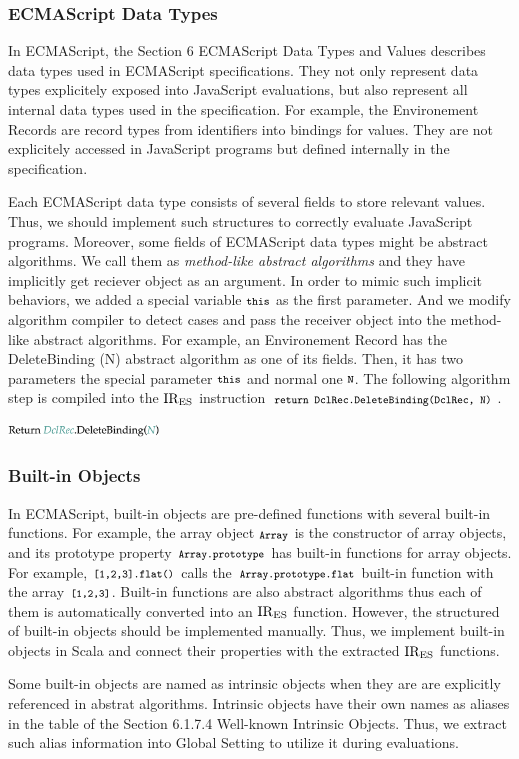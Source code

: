 \subsubsection{ECMAScript Data Types}

In ECMAScript, the Section \textsf{6 ECMAScript Data Types and Values} describes
data types used in ECMAScript specifications. They not only represent
data types explicitely exposed into JavaScript evaluations, but also
represent all internal data types used in the specification.
For example, the Environement Records are record types from identifiers
into bindings for values. They are not explicitely accessed in JavaScript
programs but defined internally in the specification.

Each ECMAScript data type consists of several fields to store relevant values.
Thus, we should implement such structures to correctly evaluate JavaScript
programs. Moreover, some fields of ECMAScript data types might be
abstract algorithms. We call them as \textit{method-like abstract algorithms}
and they have implicitly get reciever object as an argument.
In order to mimic such implicit behaviors, we added a special variable
\( \texttt{\footnotesize this} \) as the first parameter. And we modify algorithm compiler
to detect cases and pass the receiver object into the method-like abstract
algorithms. For example, an Environement Record has the \textsf{DeleteBinding (N)}
abstract algorithm as one of its fields. Then, it has two parameters the special
parameter \( \texttt{\footnotesize this} \) and normal one \( \texttt{\footnotesize N} \).
The following algorithm step is compiled into the \( \text{IR}_\text{ES} \) instruction
\( \texttt{\footnotesize return DclRec.DeleteBinding(DclRec, N)} \).
\begin{center}
  \includegraphics[width=0.3\textwidth]{img/method-like-example.png}
\end{center}


\subsubsection{Built-in Objects}
In ECMAScript, built-in objects are pre-defined functions with several
built-in functions. For example, the array object \( \texttt{\footnotesize Array} \)
is the constructor of array objects, and its prototype property
\( \texttt{\footnotesize Array.prototype} \) has built-in functions for array objects.
For example, \( \texttt{\footnotesize[1,2,3].flat()} \) calls the
\( \texttt{\footnotesize Array.prototype.flat} \) built-in function with the array
\( \texttt{\footnotesize[1,2,3]} \). Built-in functions are also abstract algorithms
thus each of them is automatically converted into an \( \text{IR}_\text{ES} \) function.
However, the structured of built-in objects should be implemented manually.
Thus, we implement built-in objects in Scala and connect their properties
with the extracted \( \text{IR}_\text{ES} \) functions.

Some built-in objects are named as intrinsic objects when they are
are explicitly referenced in abstrat algorithms.
Intrinsic objects have their own names as aliases in the table
of the Section \textsf{6.1.7.4 Well-known Intrinsic Objects}.
Thus, we extract such alias information into \textsf{Global Setting}
to utilize it during evaluations.
